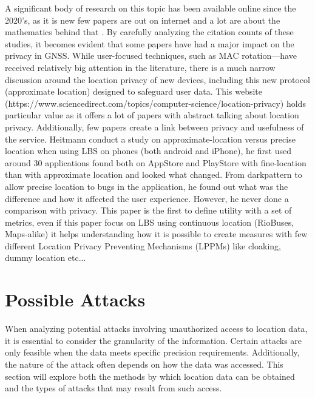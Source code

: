 \documentclass[9pt,conference]{IEEEtran}
\begin{document}
A significant body of research on this topic has been available online since the 2020's, as it is new few papers are out on internet and a lot are about the mathematics behind that \cite{lix}. By carefully analyzing the citation counts of these studies, it becomes evident that some papers have had a major impact on the privacy in GNSS. While user-focused techniques, such as MAC rotation—have received relatively big attention in the literature, there is a much narrow discussion around the location privacy of new devices, including this new protocol (approximate location) designed to safeguard user data.
This website (https://www.sciencedirect.com/topics/computer-science/location-privacy) holds particular value as it offers a lot of papers with abstract talking about location privacy.
Additionally, few papers create a link between privacy and usefulness of the service. Heitmann \cite{Heitmann02012025} conduct a study on approximate-location versus precise location when using LBS on phones (both android and iPhone), he first used around 30 applications found both on AppStore and PlayStore with fine-location than with approximate location and looked what changed. From darkpattern to allow precise location to bugs in the application, he found out what was the difference and how it affected the user experience. However, he never done a comparison with privacy.
This paper \cite{Haversine} is the first to define utility with a set of metrics, even if this paper focus on LBS using continuous location (RioBuses, Maps-alike) it helps understanding how it is possible to create measures with few different Location Privacy Preventing Mechanisms (LPPMs) like cloaking, dummy location etc... 



\section{Possible Attacks}
When analyzing potential attacks involving unauthorized access to location data, it is essential to consider the granularity of the information. Certain attacks are only feasible when the data meets specific precision requirements. Additionally, the nature of the attack often depends on how the data was accessed. This section will explore both the methods by which location data can be obtained and the types of attacks that may result from such access.

\end{document}
